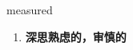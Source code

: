 
\begin{frame}
{\huge measured}
\begin{center}
\begin{enumerate}\Large
  \item \textbf{深思熟虑的，审慎的}
\end{enumerate}
\end{center}
\end{frame}
